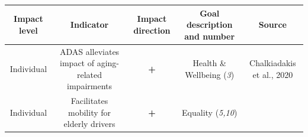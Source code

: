 \documentclass[
]{book}
\begin{document}
\begin{longtable}[]{@{}ccccc@{}}
\toprule
\begin{minipage}[b]{0.17\columnwidth}\centering
Impact level\strut
\end{minipage} & \begin{minipage}[b]{0.16\columnwidth}\centering
Indicator\strut
\end{minipage} & \begin{minipage}[b]{0.17\columnwidth}\centering
Impact direction\strut
\end{minipage} & \begin{minipage}[b]{0.17\columnwidth}\centering
Goal description and number\strut
\end{minipage} & \begin{minipage}[b]{0.17\columnwidth}\centering
Source\strut
\end{minipage}\tabularnewline
\midrule
\endhead
\begin{minipage}[t]{0.17\columnwidth}\centering
Individual\strut
\end{minipage} & \begin{minipage}[t]{0.16\columnwidth}\centering
ADAS alleviates impact of aging-related impairments\strut
\end{minipage} & \begin{minipage}[t]{0.17\columnwidth}\centering
\textbf{+}\strut
\end{minipage} & \begin{minipage}[t]{0.17\columnwidth}\centering
Health \& Wellbeing (\emph{3})\strut
\end{minipage} & \begin{minipage}[t]{0.17\columnwidth}\centering
Chalkiadakis et al., 2020\strut
\end{minipage}\tabularnewline
\begin{minipage}[t]{0.17\columnwidth}\centering
Individual\strut
\end{minipage} & \begin{minipage}[t]{0.16\columnwidth}\centering
Facilitates mobility for elderly drivers\strut
\end{minipage} & \begin{minipage}[t]{0.17\columnwidth}\centering
\textbf{+}\strut
\end{minipage} & \begin{minipage}[t]{0.17\columnwidth}\centering
Equality (\emph{5,10})\strut
\end{minipage} & \begin{minipage}[t]{0.17\columnwidth}\centering

\end{minipage}
\end{longtable}
\end{document}
